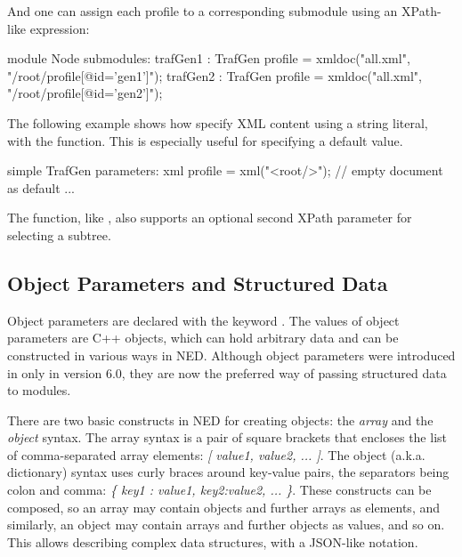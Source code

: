 And one can assign each profile to a corresponding submodule using an XPath-like
expression:

\begin{ned}
module Node {
    submodules:
        trafGen1 : TrafGen {
            profile = xmldoc("all.xml", "/root/profile[@id='gen1']");
        }
        trafGen2 : TrafGen {
            profile = xmldoc("all.xml", "/root/profile[@id='gen2']");
        }
}
\end{ned}

The following example shows how specify XML content using a string literal,
with the  function. This is especially useful
for specifying a default value.

\begin{ned}
simple TrafGen {
    parameters:
        xml profile = xml("<root/>"); // empty document as default
        ...
}
\end{ned}

The  function, like , also supports an
optional second XPath parameter for selecting a subtree.



\subsection{Object Parameters and Structured Data}
\label{sec:ned-lang:object-parameters}

Object parameters are declared with the keyword . The values of
object parameters are C++ objects, which can hold arbitrary data and can be
constructed in various ways in NED. Although object parameters were introduced
in {\opp} only in version 6.0, they are now the preferred way of passing
structured data to modules.

There are two basic constructs in NED for creating objects: the \textit{array}
and the \textit{object} syntax. The array syntax is a pair of square brackets
that encloses the list of comma-separated array elements: \textit{[ value1,
value2, ... ]}. The object (a.k.a. dictionary) syntax uses curly braces around
key-value pairs, the separators being colon and comma: \textit{\{ key1 : value1,
key2:value2, ... \}}. These constructs can be composed, so an array may contain
objects and further arrays as elements, and similarly, an object may contain
arrays and further objects as values, and so on. This allows describing complex
data structures, with a JSON-like notation.

